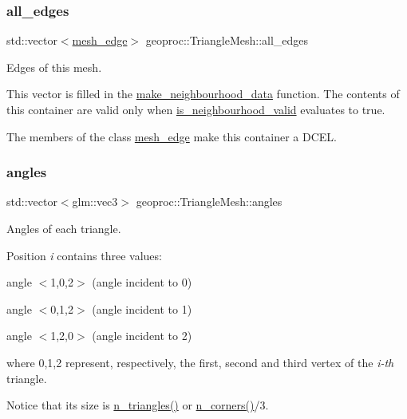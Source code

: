 \subsubsection{\texorpdfstring{all\+\_\+edges}{all\_edges}}
{\footnotesize\ttfamily std\+::vector$<$\hyperlink{classgeoproc_1_1mesh__edge}{mesh\+\_\+edge}$>$ geoproc\+::\+Triangle\+Mesh\+::all\+\_\+edges\hspace{0.3cm}{\ttfamily [protected]}}



Edges of this mesh. 

This vector is filled in the \hyperlink{classgeoproc_1_1TriangleMesh_a84003dfdfd5e591c00f01a797578ff1f}{make\+\_\+neighbourhood\+\_\+data} function. The contents of this container are valid only when \hyperlink{classgeoproc_1_1TriangleMesh_aa6f95b95709a72a14a15638bfeeed3f9}{is\+\_\+neighbourhood\+\_\+valid} evaluates to true.

The members of the class \hyperlink{classgeoproc_1_1mesh__edge}{mesh\+\_\+edge} make this container a D\+C\+EL. \mbox{\label{classgeoproc_1_1TriangleMesh_ab255af87d20d76ad84246560fa3579b3}} 
\subsubsection{\texorpdfstring{angles}{angles}}
{\footnotesize\ttfamily std\+::vector$<$glm\+::vec3$>$ geoproc\+::\+Triangle\+Mesh\+::angles\hspace{0.3cm}{\ttfamily [protected]}}



Angles of each triangle. 

Position {\itshape i} contains three values\+:
\begin{DoxyItemize}
\item angle $<$1,0,2$>$ (angle incident to 0)
\item angle $<$0,1,2$>$ (angle incident to 1)
\item angle $<$1,2,0$>$ (angle incident to 2)
\end{DoxyItemize}

where 0,1,2 represent, respectively, the first, second and third vertex of the {\itshape i-\/th} triangle.

Notice that its size is \hyperlink{classgeoproc_1_1TriangleMesh_ac6db86ebd1e12d187f4bd4fcbb1e0809}{n\+\_\+triangles()} or \hyperlink{classgeoproc_1_1TriangleMesh_a6b8c186ba032170de9d4f36b4c1d298b}{n\+\_\+corners()}/3. \mbox{\label{classgeoproc_1_1TriangleMesh_a684ecaaa03f1739856bba03167e51dd1}} 
